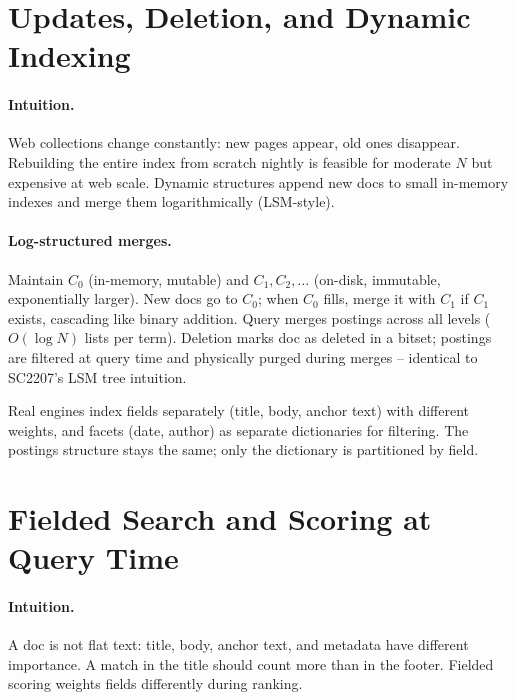 
\section{Updates, Deletion, and Dynamic Indexing}\label{sec:dynamic}
\paragraph{Intuition.} Web collections change constantly: new pages appear, old ones disappear. Rebuilding the entire index from scratch nightly is feasible for moderate $N$ but expensive at web scale. Dynamic structures append new docs to small in-memory indexes and merge them logarithmically (LSM-style).

\paragraph{Log-structured merges.} Maintain $C_0$ (in-memory, mutable) and $C_1,C_2,\dots$ (on-disk, immutable, exponentially larger). New docs go to $C_0$; when $C_0$ fills, merge it with $C_1$ if $C_1$ exists, cascading like binary addition. Query merges postings across all levels ($O(\log N)$ lists per term). Deletion marks doc as deleted in a bitset; postings are filtered at query time and physically purged during merges -- identical to SC2207's LSM tree intuition.

\begin{remark}
Real engines index fields separately (title, body, anchor text) with different weights, and facets (date, author) as separate dictionaries for filtering. The postings structure stays the same; only the dictionary is partitioned by field.
\end{remark}


\section{Fielded Search and Scoring at Query Time}\label{sec:fielded}
\paragraph{Intuition.} A doc is not flat text: title, body, anchor text, and metadata have different importance. A match in the title should count more than in the footer. Fielded scoring weights fields differently during ranking.

